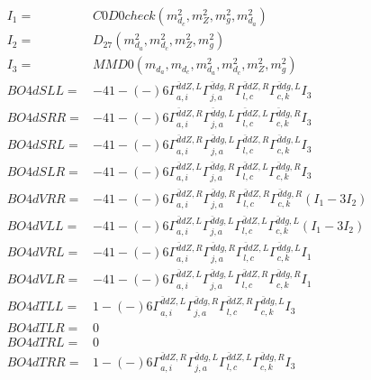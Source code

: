 \documentclass[A4,landscape]{article}
\begin{document}
\begin{align} 
I_1 = & C0D0check(m^2_{d_{{c}}}, m^2_{Z}, m^2_{g}, m^2_{d_{{a}}}) \\ 
I_2 = & D_{27}(m^2_{d_{{a}}}, m^2_{d_{{c}}}, m^2_{Z}, m^2_{g}) \\ 
I_3 = & MMD0(m_{d_{{a}}}, m_{d_{{c}}}, m^2_{d_{{a}}}, m^2_{d_{{c}}}, m^2_{Z}, m^2_{g}) \\ 
  BO4dSLL= & -4   1
-(-)
  6 \Gamma^{\bar{d}d Z ,L}_{a, i} \Gamma^{\bar{d}d g ,R}_{j, a} \Gamma^{\bar{d}d Z ,R}_{l, c} \Gamma^{\bar{d}d g ,L}_{c, k} I_3 \\ 
  BO4dSRR= & -4   1
-(-)
  6 \Gamma^{\bar{d}d Z ,R}_{a, i} \Gamma^{\bar{d}d g ,L}_{j, a} \Gamma^{\bar{d}d Z ,L}_{l, c} \Gamma^{\bar{d}d g ,R}_{c, k} I_3 \\ 
  BO4dSRL= & -4   1
-(-)
  6 \Gamma^{\bar{d}d Z ,R}_{a, i} \Gamma^{\bar{d}d g ,L}_{j, a} \Gamma^{\bar{d}d Z ,R}_{l, c} \Gamma^{\bar{d}d g ,L}_{c, k} I_3 \\ 
  BO4dSLR= & -4   1
-(-)
  6 \Gamma^{\bar{d}d Z ,L}_{a, i} \Gamma^{\bar{d}d g ,R}_{j, a} \Gamma^{\bar{d}d Z ,L}_{l, c} \Gamma^{\bar{d}d g ,R}_{c, k} I_3 \\ 
  BO4dVRR= & -4   1
-(-)
  6 \Gamma^{\bar{d}d Z ,R}_{a, i} \Gamma^{\bar{d}d g ,R}_{j, a} \Gamma^{\bar{d}d Z ,R}_{l, c} \Gamma^{\bar{d}d g ,R}_{c, k} (I_1 - 3 I_2) \\ 
  BO4dVLL= & -4   1
-(-)
  6 \Gamma^{\bar{d}d Z ,L}_{a, i} \Gamma^{\bar{d}d g ,L}_{j, a} \Gamma^{\bar{d}d Z ,L}_{l, c} \Gamma^{\bar{d}d g ,L}_{c, k} (I_1 - 3 I_2) \\ 
  BO4dVRL= & -4   1
-(-)
  6 \Gamma^{\bar{d}d Z ,R}_{a, i} \Gamma^{\bar{d}d g ,R}_{j, a} \Gamma^{\bar{d}d Z ,L}_{l, c} \Gamma^{\bar{d}d g ,L}_{c, k} I_1 \\ 
  BO4dVLR= & -4   1
-(-)
  6 \Gamma^{\bar{d}d Z ,L}_{a, i} \Gamma^{\bar{d}d g ,L}_{j, a} \Gamma^{\bar{d}d Z ,R}_{l, c} \Gamma^{\bar{d}d g ,R}_{c, k} I_1 \\ 
  BO4dTLL= &   1
-(-)
  6 \Gamma^{\bar{d}d Z ,L}_{a, i} \Gamma^{\bar{d}d g ,R}_{j, a} \Gamma^{\bar{d}d Z ,R}_{l, c} \Gamma^{\bar{d}d g ,L}_{c, k} I_3 \\ 
  BO4dTLR= & 0 \\ 
  BO4dTRL= & 0 \\ 
  BO4dTRR= &   1
-(-)
  6 \Gamma^{\bar{d}d Z ,R}_{a, i} \Gamma^{\bar{d}d g ,L}_{j, a} \Gamma^{\bar{d}d Z ,L}_{l, c} \Gamma^{\bar{d}d g ,R}_{c, k} I_3 \\ 
\end{align} 
\end{document}
